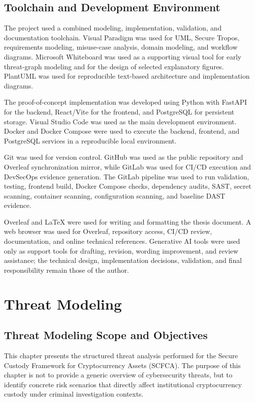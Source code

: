 \documentclass[12pt,a4paper]{report}
\begin{document}
\section{Toolchain and Development Environment}

The project used a combined modeling, implementation, validation, and documentation toolchain. Visual Paradigm was used for UML, Secure Tropos, requirements modeling, misuse-case analysis, domain modeling, and workflow diagrams. Microsoft Whiteboard was used as a supporting visual tool for early threat-graph modeling and for the design of selected explanatory figures. PlantUML was used for reproducible text-based architecture and implementation diagrams.

The proof-of-concept implementation was developed using Python with FastAPI for the backend, React/Vite for the frontend, and PostgreSQL for persistent storage. Visual Studio Code was used as the main development environment. Docker and Docker Compose were used to execute the backend, frontend, and PostgreSQL services in a reproducible local environment.

Git was used for version control. GitHub was used as the public repository and Overleaf synchronization mirror, while GitLab was used for CI/CD execution and DevSecOps evidence generation. The GitLab pipeline was used to run validation, testing, frontend build, Docker Compose checks, dependency audits, SAST, secret scanning, container scanning, configuration scanning, and baseline DAST evidence.

Overleaf and LaTeX were used for writing and formatting the thesis document. A web browser was used for Overleaf, repository access, CI/CD review, documentation, and online technical references. Generative AI tools were used only as support tools for drafting, revision, wording improvement, and review assistance; the technical design, implementation decisions, validation, and final responsibility remain those of the author.


\chapter{Threat Modeling}

\section{Threat Modeling Scope and Objectives}

This chapter presents the structured threat analysis performed for the Secure Custody Framework for Cryptocurrency Assets (SCFCA). The purpose of this chapter is not to provide a generic overview of cybersecurity threats, but to identify concrete risk scenarios that directly affect institutional cryptocurrency custody under criminal investigation contexts.
\end{document}
